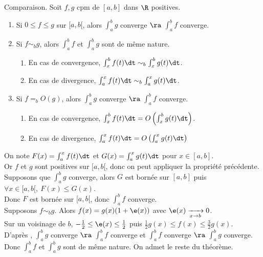\documentclass[11pt]{article}
\begin{document}
\begin{thm}{Comparaison.}{}
    Soit $f,g$ cpm de $[a,b]$ dans $\R$ positives.
    \begin{enumerate}
        \item Si $0\leq f \leq g$ sur $[a,b[$, alors $\int_a^bg$ converge $\ra$ $\int_a^bf$ converge.
        \item Si $f\sim_b g$, alors $\int_a^b f$ et $\int_a^b g$ sont de même nature.
        \begin{enumerate}
            \item En cas de convergence, $\int_x^bf(t)\dt \sim_b \int_x^bg(t)\dt$.
            \item En cas de divergence, $\int_a^xf(t)\dt\sim_b\int_a^xg(t)\dt$.
        \end{enumerate}
        \item Si $f=_bO(g)$, alors $\int_a^b g$ converge $\ra$ $\int_a^b f$ converge.
        \begin{enumerate}
            \item En cas de convergence, $\int_x^bf(t)\dt=O\left( \int_x^bg(t)\dt \right)$.
            \item En cas de divergence, $\int_a^xf(t)\dt=O\left( \int_a^xg(t)\dt\right)$
        \end{enumerate}
    \end{enumerate}
    \tcblower
     On note $F(x)=\int_a^xf(t)\dt$ et $G(x)=\int_a^xg(t)\dt$ pour $x\in[a,b]$.\\
    Or $f$ et $g$ sont positives sur $[a,b[$, donc on peut appliquer la propriété précédente.\\
    Supposons que $\int_a^b g$ converge, alors $G$ est bornée sur $[a,b]$ puis $\forall x \in [a,b[, ~ F(x)\leq G(x)$.\\
    Donc $F$ est bornée sur $[a,b[$, donc $\int_a^bf$ converge.\\
     Supposons $f\sim_bg$. Alors $f(x)=g(x)(1+\e(x))$ avec $\e(x)\xrightarrow[x\to b]{}0$.\\
    Sur un voisinage de $b$, $-\frac{1}{2}\leq \e(x) \leq \frac{1}{2}$ puis $\frac{1}{2}g(x)\leq f(x) \leq \frac{3}{2}g(x)$.\\
    D'après , $\int_a^bg$ converge $\ra$ $\int_a^b f$ converge et $\int_a^b f$ converge $\ra$ $\int_a^b g$ converge. \\
    Donc $\int_a^b f$ et $\int_a^bg$ sont de même nature. On admet le reste du théorème. 
\end{thm}
\end{document}
